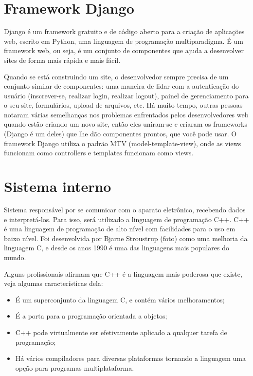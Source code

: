 \section{Framework Django}

Django é um framework gratuito e de código aberto para a criação de aplicações web, escrito em Python, uma linguagem de programação multiparadigma. É um framework web, ou seja, é um conjunto de componentes que ajuda a desenvolver sites de forma mais rápida e mais fácil.

Quando se está construindo um site, o desenvolvedor sempre precisa de um conjunto similar de componentes: uma maneira de lidar com a autenticação do usuário (inscrever-se, realizar login, realizar logout), painel de gerenciamento para o seu site, formulários, upload de arquivos, etc. Há muito tempo, outras pessoas notaram várias semelhanças nos problemas enfrentados pelos desenvolvedores web quando estão criando um novo site, então eles uniram-se e criaram os frameworks (Django é um deles) que lhe dão componentes prontos, que você pode usar. O framework Django utiliza o padrão MTV (model-template-view), onde as views funcionam como controllers e templates funcionam como views. 

\section{Sistema interno}

Sistema responsável por se comunicar com o aparato eletrônico, recebendo dados e interpretá-los. Para isso, será utilizado a linguagem de programação C++. C++ é uma linguagem de programação de alto nível com facilidades para o uso em baixo nível. Foi desenvolvida por Bjarne Stroustrup (foto) como uma melhoria da linguagem C, e desde os anos 1990 é uma das linguagens mais populares do mundo.

Alguns profissionais afirmam que C++ é a linguagem mais poderosa que existe, veja algumas características dela:

\begin{itemize}
\item É um superconjunto da linguagem C, e contém vários melhoramentos;
\item É a porta para a programação orientada a objetos;
\item C++ pode virtualmente ser efetivamente aplicado a qualquer tarefa de programação;
\item Há vários compiladores para diversas plataformas tornando a linguagem uma opção para programas multiplataforma.
\end{itemize}







